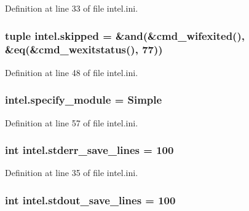 Definition at line 33 of file intel.\-ini.

\hypertarget{namespaceintel_a0a787d49a6dd289fbd58591c9de5fbb5}{
\subsubsection[{skipped}]{\setlength{\rightskip}{0pt plus 5cm}tuple intel.\-skipped = \&and(\&cmd\-\_\-wifexited(), \&eq(\&cmd\-\_\-wexitstatus(), 77))}}\label{namespaceintel_a0a787d49a6dd289fbd58591c9de5fbb5}


Definition at line 48 of file intel.\-ini.

\hypertarget{namespaceintel_a013bf13af420a4b19b5adc9846a18346}{
\subsubsection[{specify\-\_\-module}]{\setlength{\rightskip}{0pt plus 5cm}intel.\-specify\-\_\-module = Simple}}\label{namespaceintel_a013bf13af420a4b19b5adc9846a18346}


Definition at line 57 of file intel.\-ini.

\hypertarget{namespaceintel_a1d6c46c17a246ddee37c7ee9113b90c4}{
\subsubsection[{stderr\-\_\-save\-\_\-lines}]{\setlength{\rightskip}{0pt plus 5cm}int intel.\-stderr\-\_\-save\-\_\-lines = 100}}\label{namespaceintel_a1d6c46c17a246ddee37c7ee9113b90c4}


Definition at line 35 of file intel.\-ini.

\hypertarget{namespaceintel_a81a6cddb285ad15b56a91a58c0032984}{
\subsubsection[{stdout\-\_\-save\-\_\-lines}]{\setlength{\rightskip}{0pt plus 5cm}int intel.\-stdout\-\_\-save\-\_\-lines = 100}}\label{namespaceintel_a81a6cddb285ad15b56a91a58c0032984}


